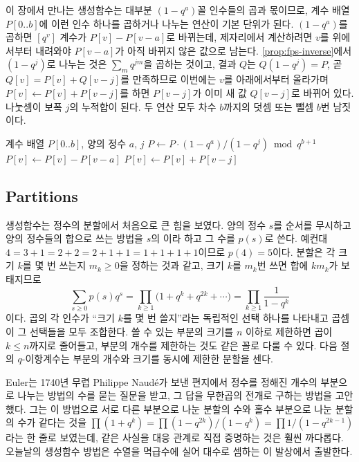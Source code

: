 이 장에서 만나는 생성함수는 대부분 $(1-q^a)$꼴 인수들의 곱과 몫이므로, 계수 배열 $P[0..b]$에 이런 인수 하나를 곱하거나 나누는 연산이 기본 단위가 된다. $(1-q^a)$를 곱하면 $[q^v]$ 계수가 $P[v]-P[v-a]$로 바뀌는데, 제자리에서 계산하려면 $v$를 위에서부터 내려와야 $P[v-a]$가 아직 바뀌지 않은 값으로 남는다. \cref{prop:fps-inverse}에서 $(1-q^j)$로 나누는 것은 $\sum_mq^{jm}$을 곱하는 것이고, 결과 $Q$는 $Q(1-q^j)=P$, 곧 $Q[v]=P[v]+Q[v-j]$를 만족하므로 이번에는 $v$를 아래에서부터 올라가며 $P[v]\gets P[v]+P[v-j]$를 하면 $P[v-j]$가 이미 새 값 $Q[v-j]$로 바뀌어 있다. 나눗셈이 보폭 $j$의 누적합이 된다. 두 연산 모두 차수 $b$까지의 덧셈 또는 뺄셈 $b$번 남짓이다.

\begin{algorithm}[t]
\begin{algorithmic}[1]
\Require 계수 배열 $P[0..b]$, 양의 정수 $a$, $j$
\Ensure $P\gets P\cdot(1-q^a)/(1-q^j)\bmod q^{b+1}$
 
  \State $P[v]\gets P[v]-P[v-a]$
\EndFor
{} 
  \State $P[v]\gets P[v]+P[v-j]$
\EndFor
\end{algorithmic}
\caption{$(1-q^a)/(1-q^j)$를 제자리에서 곱하기}
\label{alg:factor-step}
\end{algorithm}

\subsection{Partitions}

생성함수는 정수의 분할에서 처음으로 큰 힘을 보였다. 양의 정수 $s$를 순서를 무시하고 양의 정수들의 합으로 쓰는 방법을 $s$의 이라 하고 그 수를 $p(s)$로 쓴다. 예컨대 $4=3+1=2+2=2+1+1=1+1+1+1$이므로 $p(4)=5$이다. 분할은 각 크기 $k$를 몇 번 쓰는지 $m_k\ge0$을 정하는 것과 같고, 크기 $k$를 $m_k$번 쓰면 합에 $km_k$가 보태지므로
\[
\sum_{s\ge0}p(s)q^s=\prod_{k\ge1}\bigl(1+q^k+q^{2k}+\cdots\bigr)=\prod_{k\ge1}\frac1{1-q^k}
\]
이다. 곱의 각 인수가 ``크기 $k$를 몇 번 쓸지''라는 독립적인 선택 하나를 나타내고 곱셈이 그 선택들을 모두 조합한다. 쓸 수 있는 부분의 크기를 $n$ 이하로 제한하면 곱이 $k\le n$까지로 줄어들고, 부분의 개수를 제한하는 것도 같은 꼴로 다룰 수 있다. 다음 절의 $q$-이항계수는 부분의 개수와 크기를 동시에 제한한 분할을 센다.

\begin{aside}[Euler와 분할]
Euler는 1740년 무렵 Philippe Naudé가 보낸 편지에서 정수를 정해진 개수의 부분으로 나누는 방법의 수를 묻는 질문을 받고, 그 답을 무한곱의 전개로 구하는 방법을 고안했다. 그는 이 방법으로 서로 다른 부분으로 나눈 분할의 수와 홀수 부분으로 나눈 분할의 수가 같다는 것을 $\prod(1+q^k)=\prod(1-q^{2k})/(1-q^k)=\prod1/(1-q^{2k-1})$라는 한 줄로 보였는데, 같은 사실을 대응 관계로 직접 증명하는 것은 훨씬 까다롭다. 오늘날의 생성함수 방법은 수열을 멱급수에 실어 대수로 셈하는 이 발상에서 출발한다\cite{andrews1998partitions}.
\end{aside}

